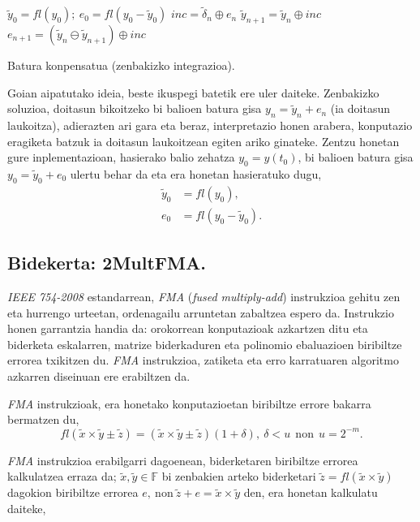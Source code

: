 \begin{algorithm}[H]
 \BlankLine
  $\tilde{y}_{0}=fl(y_{0}); \ e_0=fl(y_0-\tilde{y}_0)$\;
 \BlankLine
  {
   \BlankLine
    $inc=\tilde {\delta}_n \oplus e_n$\;
    $\tilde {y}_{n+1}=\tilde{y}_n \oplus inc$\;
    $e_{n+1}=(\tilde{y}_n \ominus \tilde {y}_{n+1}) \oplus inc$\;
   \BlankLine
  }
 \caption{Batura konpensatua (zenbakizko integrazioa).}
 \label{alg:batkp}
\end{algorithm}


Goian aipatutako ideia,  beste ikuspegi batetik ere uler daiteke. Zenbakizko soluzioa, doitasun bikoitzeko bi balioen batura gisa $y_n=\tilde{y}_n+e_n$ (ia doitasun laukoitza), adierazten ari gara  eta beraz, interpretazio honen arabera, konputazio eragiketa batzuk ia doitasun laukoitzean egiten ariko ginateke. Zentzu honetan gure inplementazioan, hasierako balio zehatza $y_0=y(t_0)$, bi balioen batura gisa $y_0=\tilde{y}_0+e_0$ ulertu behar da eta era honetan hasieratuko dugu,
\begin{align*}
\tilde{y}_0 &=fl(y_0) ,\\
e_0 &=fl(y_0-\tilde{y}_0).
\end{align*}

\subsection*{Bidekerta: 2MultFMA.}

\emph{IEEE 754-2008} estandarrean, \emph{FMA} \cite{Muller2009} (\emph{fused multiply-add}) instrukzioa gehitu zen eta hurrengo urteetan, ordenagailu arruntetan zabaltzea espero da. Instrukzio honen garrantzia handia da: orokorrean konputazioak azkartzen ditu eta biderketa eskalarren, matrize biderkaduren eta polinomio ebaluazioen biribiltze errorea txikitzen du. \emph{FMA} instrukzioa, zatiketa eta erro karratuaren algoritmo azkarren diseinuan ere erabiltzen da.

\emph{FMA} instrukzioak, era honetako konputazioetan biribiltze errore bakarra bermatzen du,
\begin{equation*}
fl(\tilde x \times \tilde y \pm \tilde z)= (\tilde x \times \tilde y\pm \tilde z) (1+\delta), \ \delta<u \ \ \text{non} \ \ u=2^{-m}.
\end{equation*}
 

\emph{FMA}  instrukzioa erabilgarri dagoenean, biderketaren biribiltze errorea kalkulatzea erraza da; $\tilde x,\tilde y \in \mathbb{F}$ bi zenbakien arteko biderketari $\tilde z= fl(\tilde x \times \tilde y)$ dagokion biribiltze errorea $e, \ \text{non} \  \tilde{z}+ e=\tilde x \times \tilde y$ den, era honetan kalkulatu daiteke,

